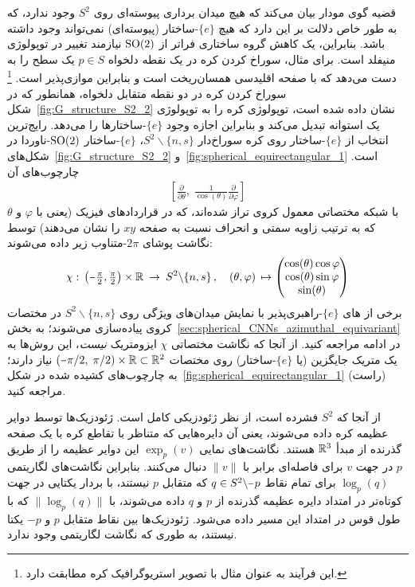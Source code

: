 قضیه گوی مودار بیان می‌کند که هیچ میدان برداری پیوسته‌ای روی $S^2$ وجود ندارد، که به طور خاص دلالت بر این دارد که هیچ $\{e\}$-ساختار (پیوسته‌ای) نمی‌تواند وجود داشته باشد.
بنابراین، یک کاهش گروه ساختاری فراتر از $\operatorname{SO}(2)$ نیازمند تغییر در توپولوژی منیفلد است.
برای مثال، سوراخ کردن کره در یک نقطه دلخواه $p\in S$ یک سطح را به دست می‌دهد که با صفحه اقلیدسی همسان‌ریخت است و بنابراین موازی‌پذیر است.%
\footnote{
    این فرآیند به عنوان مثال با تصویر استریوگرافیک کره مطابقت دارد.
}
سوراخ کردن کره در دو نقطه متقابل دلخواه، همانطور که در شکل~\ref{fig:G_structure_S2_2} نشان داده شده است، توپولوژی کره را به توپولوژی یک استوانه تبدیل می‌کند و بنابراین اجازه وجود $\{e\}$-ساختارها را می‌دهد.
رایج‌ترین انتخاب از $\{e\}$-ساختار روی کره سوراخ‌دار $S^2 \backslash \{n,s\}$، $\{e\}$-ساختار $\operatorname{SO}(2)$-ناوردا در شکل‌های~\ref{fig:G_structure_S2_2} و~\ref{fig:spherical_equirectangular_1} است.
چارچوب‌های آن
\begin{align}\label{eq:spherical_e_structure_frames}
    \left[ \frac{\partial}{\partial\theta} ,\; \frac{1}{\cos(\theta)} \frac{\partial}{\partial\varphi} \right]
\end{align}
با شبکه مختصاتی معمول کروی تراز شده‌اند، که در قراردادهای فیزیک
(یعنی با $\varphi$ و $\theta$ که به ترتیب زاویه سمتی و انحراف نسبت به صفحه $xy$ را نشان می‌دهند)
توسط نگاشت پوشای $2\pi$-متناوب زیر داده می‌شوند:
\begin{align}\label{eq:spherical_coords}
    \chi:\, \big( {\textstyle \minus\frac{\pi}{2}, \frac{\pi}{2} }\big) \times \R \:\to\: S^2 \backslash \{n,s\}
    \,, \quad
    (\theta, \varphi) \,\mapsto
    \begin{pmatrix}
        \cos(\theta) \cos{\varphi} \\
        \cos(\theta) \sin{\varphi} \\
        \sin(\theta)
    \end{pmatrix}
\end{align}
برخی از های $\{e\}$-راهبری‌پذیر با نمایش میدان‌های ویژگی روی $S^2 \backslash \{n,s\}$ در مختصات کروی پیاده‌سازی می‌شوند؛ به بخش~\ref{sec:spherical_CNNs_azimuthal_equivariant} در ادامه مراجعه کنید.
از آنجا که نگاشت مختصاتی $\chi$ ایزومتریک \emph{نیست}، این روش‌ها به یک متریک جایگزین (یا $\{e\}$-ساختار) روی مختصات ${(\minus \pi/2 ,\; \pi/2) \times \R \subset \R^2}$ نیاز دارند؛ به چارچوب‌های کشیده شده در شکل~\ref{fig:spherical_equirectangular_1} (راست) مراجعه کنید.


از آنجا که $S^2$ فشرده است، از نظر ژئودزیکی کامل است.
ژئودزیک‌ها توسط دوایر عظیمه کره داده می‌شوند، یعنی آن دایره‌هایی که متناظر با تقاطع کره با یک صفحه گذرنده از مبدأ $\mathbb{R}^3$ هستند.
نگاشت‌های نمایی $\exp_p(v)$ این دوایر عظیمه را از طریق $p$ در جهت $v$ برای فاصله‌ای برابر با $\lVert v\rVert$ دنبال می‌کنند.
بنابراین نگاشت‌های لگاریتمی $\log_p(q)$ برای تمام نقاط $q \in S^2 \backslash \mkern-1mu\minus\mkern1mu p$ که متقابل $p$ نیستند، با بردار یکتایی در جهت کوتاه‌تر در امتداد دایره عظیمه گذرنده از $p$ و $q$ داده می‌شوند، با $\lVert\log_p(q)\rVert$ که با طول قوس در امتداد این مسیر داده می‌شود.
ژئودزیک‌ها بین نقاط متقابل $p$ و $-p$ یکتا نیستند، به طوری که نگاشت لگاریتمی وجود ندارد.


